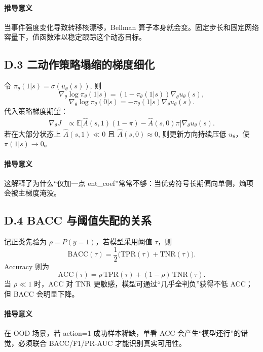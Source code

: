 ﻿\documentclass[11pt,a4paper]{ctexart}
\begin{document}
\paragraph{推导意义}
当事件强度变化导致转移核漂移，Bellman 算子本身就会变。固定步长和固定网络容量下，值函数难以稳定跟踪这个动态目标。

\subsection*{D.3 二动作策略塌缩的梯度细化}
令
\(
\pi_\theta(1|s)=\sigma(u_\theta(s))
\),
则
\begin{equation}
\nabla_\theta \log\pi_\theta(1|s)
=(1-\pi_\theta(1|s))\nabla_\theta u_\theta(s),
\end{equation}
\begin{equation}
\nabla_\theta \log\pi_\theta(0|s)
=-\pi_\theta(1|s)\nabla_\theta u_\theta(s).
\end{equation}
代入策略梯度期望：
\begin{align}
\nabla_\theta J
&\propto
\mathbb{E}\Big[
\hat A(s,1)(1-\pi)
-\hat A(s,0)\pi
\Big]\nabla_\theta u_\theta(s).
\end{align}
若在大部分状态上
\(
\hat A(s,1)\ll 0
\)
且
\(
\hat A(s,0)\approx 0
\),
则更新方向持续压低 $u_\theta$，使
\(
\pi(1|s)\to 0
\)。

\paragraph{推导意义}
这解释了为什么“仅加一点 ent\_coef”常常不够：当优势符号长期偏向单侧，熵项会被主梯度淹没。

\subsection*{D.4 BACC 与阈值失配的关系}
记正类先验为 $\rho=P(y=1)$，若模型采用阈值 $\tau$，则
\begin{equation}
\text{BACC}(\tau)
=\frac{1}{2}\big(\mathrm{TPR}(\tau)+\mathrm{TNR}(\tau)\big).
\end{equation}
Accuracy 则为
\begin{equation}
\text{ACC}(\tau)=\rho\,\mathrm{TPR}(\tau)+(1-\rho)\,\mathrm{TNR}(\tau).
\end{equation}
当 $\rho\ll 1$ 时，ACC 对 TNR 更敏感，模型可通过“几乎全判负”获得不低 ACC；但 BACC 会明显下降。

\paragraph{推导意义}
在 OOD 场景，若 action=1 成功样本稀缺，单看 ACC 会产生“模型还行”的错觉，必须联合 BACC/F1/PR-AUC 才能识别真实可用性。
\end{document}
